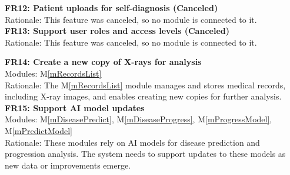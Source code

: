 \documentclass[12pt, titlepage]{article}
\newcommand{\mref}[1]{M\ref{#1}}
\begin{document}
\textbf{FR12: Patient uploads for self-diagnosis (Canceled)} \\
Rationale: This feature was canceled, so no module is connected to it. \\
\newline
\textbf{FR13: Support user roles and access levels (Canceled)} \\
Rationale: This feature was canceled, so no module is connected to it. \\
\newline

\textbf{FR14: Create a new copy of X-rays for analysis} \\
Modules: \mref{mRecordsList} \\
Rationale: The \mref{mRecordsList} module manages and stores medical records, including X-ray images, and enables creating new copies for further analysis. \\
\newline
\textbf{FR15: Support AI model updates} \\
Modules: \mref{mDiseasePredict}, \mref{mDiseaseProgress}, \mref{mProgressModel}, \mref{mPredictModel} \\
Rationale: These modules rely on AI models for disease prediction and progression analysis. The system needs to support updates to these models as new data or improvements emerge. \\
\newline
\end{document}
